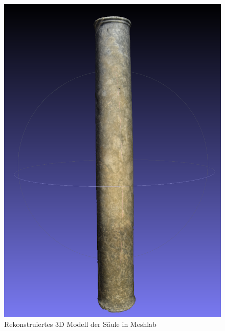 \documentclass[twocolumn]{bmcart}
\begin{document}
\begin{figure}[h]
\centering
\includegraphics[width=1\linewidth]{figures/screenshot007}
\caption{Rekonstruiertes 3D Modell der Säule in Meshlab}
\label{fig:screenshot007}
\end{figure}
\end{document}
